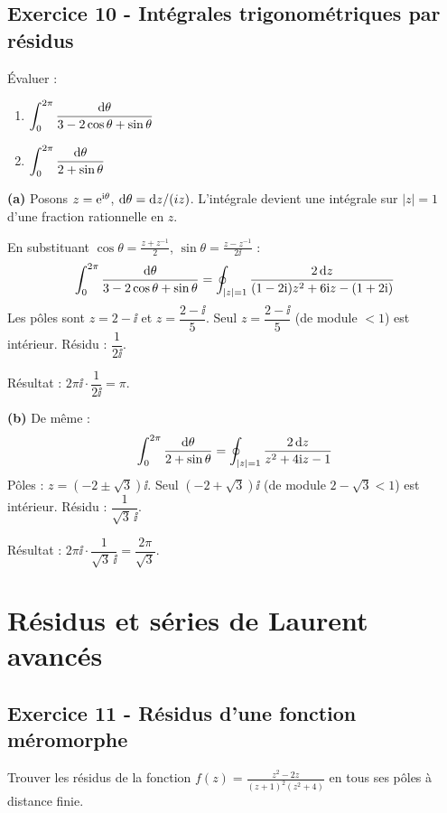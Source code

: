 \documentclass[12pt,a4paper]{article}
\begin{document}
\subsection*{Exercice 10 - Intégrales trigonométriques par résidus \niveau{\difficile}}

\begin{boiteexercice}
Évaluer :
\begin{enumerate}[label=(\alph*)]
  \item $\displaystyle\int_0^{2\pi}\frac{\mathrm{d}\theta}{3-2\cos\theta+\sin\theta}$
  \item $\displaystyle\int_0^{2\pi}\frac{\mathrm{d}\theta}{2+\sin\theta}$
\end{enumerate}
\end{boiteexercice}

\begin{boitecorrige}
\textbf{(a)} Posons $z=\mathrm{e}^{\mathrm{i}\theta}$, $\mathrm{d}\theta=\mathrm{d} z/(iz)$. L'intégrale devient une intégrale sur $|z|=1$ d'une fraction rationnelle en $z$.

En substituant $\cos\theta=\frac{z+z^{-1}}{2}$, $\sin\theta=\frac{z-z^{-1}}{2\ii}$ :
\[
\int_0^{2\pi}\frac{\mathrm{d}\theta}{3-2\cos\theta+\sin\theta} = \oint_{|z|=1}\frac{2\,\mathrm{d} z}{(1-2\mathrm{i})z^2+6\mathrm{i} z-(1+2\mathrm{i})}
\]
Les pôles sont $z=2-\ii$ et $z=\dfrac{2-\ii}{5}$. Seul $z=\dfrac{2-\ii}{5}$ (de module $<1$) est intérieur. Résidu : $\dfrac{1}{2\ii}$.

Résultat : $2\pi\ii\cdot\dfrac{1}{2\ii} = \pi$.

\textbf{(b)} De même :
\[
\int_0^{2\pi}\frac{\mathrm{d}\theta}{2+\sin\theta} = \oint_{|z|=1}\frac{2\,\mathrm{d} z}{z^2+4\mathrm{i} z-1}
\]
Pôles : $z = (-2\pm\sqrt{3})\ii$. Seul $(-2+\sqrt{3})\ii$ (de module $2-\sqrt{3}<1$) est intérieur. Résidu : $\dfrac{1}{\sqrt{3}\,\ii}$.

Résultat : $2\pi\ii\cdot\dfrac{1}{\sqrt{3}\,\ii} = \dfrac{2\pi}{\sqrt{3}}$.
\end{boitecorrige}

\section{Résidus et séries de Laurent avancés}

\subsection*{Exercice 11 - Résidus d'une fonction méromorphe \niveau{\difficile}}

\begin{boiteexercice}
Trouver les résidus de la fonction $\displaystyle f(z) = \frac{z^2-2z}{(z+1)^2(z^2+4)}$ en tous ses pôles à distance finie.
\end{boiteexercice}
\end{document}
